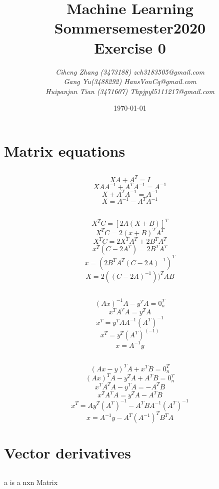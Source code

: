 \documentclass{article}
\begin{document}
\begin{titlepage}
    \title{\Huge \textbf{Machine Learning\\Sommersemester2020\\Exercise 0} }
    \author{\LARGE \textsl{Ciheng Zhang (3473188) zch3183505@gmail.com}\\\LARGE \textsl{Gang Yu(3488292) HansVonCq@gmail.com}\\\LARGE \textsl{Huipanjun Tian (3471607)  Thpjpyl5111217@gmail.com} \\[200pt]}
    \date{\today}
    \maketitle
    \thispagestyle{empty}
\end{titlepage}
\newpage
\section{Matrix equations}
\subsection{ }
    \[XA+A^T=I\]
    \[XAA^{-1}+A^TA^{-1}=A^{-1}\]
    \[X+A^TA^{-1}=A^{-1}\]
    \[X=A^{-1}-A^TA^{-1}\] 
\subsection{ }
\[X^TC=[2A(X+B)]^T\]
\[X^TC=2(x+B)^TA^T\]
\[X^TC=2X^TA^T+2B^TA^T\]
\[x^T(C-2A^T)=2B^TA^T\]
\[x=(2B^TA^T(C-2A)^{-1})^T\]
\[X=2 ((C-2A)^{-1}))^TAB\]
\subsection{ }
\[(Ax)^{-1}A-y^TA=0_n^T\]
\[x^TA^TA=y^TA\]
\[x^T=y^TAA^{-1}(A^T)^{-1}\]
\[x^T=y^T(A^T)^(-1)\]
\[x=A^{-1}y\]
\subsection{ }
\[(Ax-y)^TA+x^TB=0_n^T\]
\[(Ax)^TA-y^TA+A^TB=0_n^T\]
\[x^TA^TA-y^TA=-A^TB\]
\[x^TA^TA=y^TA-A^TB\]
\[x^T=Ay^T(A^T)^{-1}-A^TBA^{-1}(A^T)^{-1}\]
\[x=A^{-1}y-A^T(A^{-1})^TB^TA\]
\section{Vector derivatives}
\subsection{ }
a is a nxn Matrix
\end{document}
